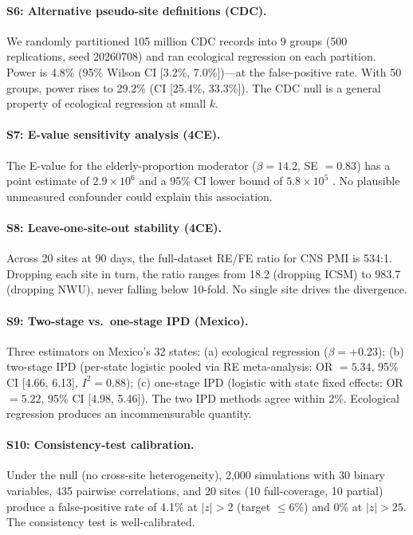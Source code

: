 \documentclass[11pt]{article}
\begin{document}
\paragraph{S6: Alternative pseudo-site definitions (CDC).}
We randomly partitioned 105 million CDC records into 9 groups
(500 replications, seed 20260708) and ran ecological regression
on each partition.  Power is 4.8\% (95\% Wilson CI [3.2\%, 7.0\%])---at
the false-positive rate.  With 50 groups, power rises to 29.2\%
(CI [25.4\%, 33.3\%]).  The CDC null is a general property of
ecological regression at small $k$.

\paragraph{S7: E-value sensitivity analysis (4CE).}
The E-value for the elderly-proportion moderator ($\beta = 14.2$,
SE $= 0.83$) has a point estimate of $2.9 \times 10^{6}$ and a
95\% CI lower bound of $5.8 \times 10^{5}$
\cite{vanderweele2017}.  No plausible unmeasured confounder could
explain this association.

\paragraph{S8: Leave-one-site-out stability (4CE).}
Across 20 sites at 90 days, the full-dataset RE/FE ratio for CNS PMI
is 534:1.  Dropping each site in turn, the ratio ranges from 18.2
(dropping ICSM) to 983.7 (dropping NWU), never falling below 10-fold.
No single site drives the divergence.

\paragraph{S9: Two-stage vs.\ one-stage IPD (Mexico).}
Three estimators on Mexico's 32 states: (a) ecological regression
($\beta = +0.23$); (b) two-stage IPD (per-state logistic pooled
via RE meta-analysis: OR $= 5.34$, 95\% CI [4.66, 6.13],
$I^2 = 0.88$); (c) one-stage IPD (logistic with state fixed effects:
OR $= 5.22$, 95\% CI [4.98, 5.46]).  The two IPD methods agree
within 2\%.  Ecological regression produces an incommensurable quantity.

\paragraph{S10: Consistency-test calibration.}
Under the null (no cross-site heterogeneity), 2{,}000 simulations
with 30 binary variables, 435 pairwise correlations, and 20 sites
(10 full-coverage, 10 partial) produce a false-positive rate of
4.1\% at $|z| > 2$ (target $\leq 6\%$) and 0\% at $|z| > 25$.
The consistency test is well-calibrated.
\end{document}
